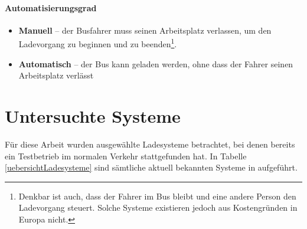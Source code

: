 \paragraph{Automatisierungsgrad}
\begin{itemize}
	\item \textbf{Manuell} – der Busfahrer muss seinen Arbeitsplatz verlassen, um den Ladevorgang zu beginnen und zu beenden\footnote{Denkbar ist auch, dass der Fahrer im Bus bleibt und eine andere Person den Ladevorgang steuert. Solche Systeme existieren jedoch aus Kostengründen in Europa nicht.}.
	\item \textbf{Automatisch} – der Bus kann geladen werden, ohne dass der Fahrer seinen Arbeitsplatz verlässt
\end{itemize}

\section{Untersuchte Systeme}
\label{untersuchte_Systeme}
Für diese Arbeit wurden ausgewählte Ladesysteme betrachtet, bei denen bereits ein Testbetrieb im normalen Verkehr stattgefunden hat. In Tabelle \ref{uebersichtLadesysteme} sind sämtliche aktuell bekannten Systeme in aufgeführt.

